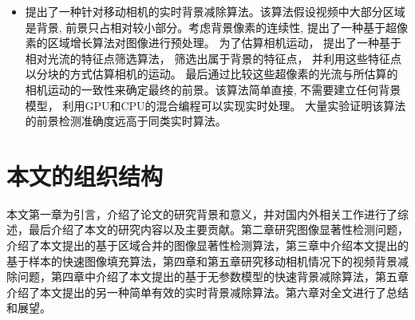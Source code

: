 \begin{itemize}
    \item 提出了一种针对移动相机的实时背景减除算法。该算法假设视频中大部分区域是背景, 前景只占相对较小部分。考虑背景像素的连续性, 提出了一种基于超像素的区域增长算法对图像进行预处理。 为了估算相机运动， 提出了一种基于相对光流的特征点筛选算法， 筛选出属于背景的特征点， 并利用这些特征点以分块的方式估算相机的运动。 最后通过比较这些超像素的光流与所估算的相机运动的一致性来确定最终的前景。该算法简单直接, 不需要建立任何背景模型， 利用GPU和CPU的混合编程可以实现实时处理。 大量实验证明该算法的前景检测准确度远高于同类实时算法。
  \end{itemize}
\section{本文的组织结构}
\label{sec:hierarchy} 
本文第一章为引言，介绍了论文的研究背景和意义，并对国内外相关工作进行了综述，最后介绍了本文的研究内容以及主要贡献。第二章研究图像显著性检测问题，介绍了本文提出的基于区域合并的图像显著性检测算法，第三章中介绍本文提出的基于样本的快速图像填充算法，第四章和第五章研究移动相机情况下的视频背景减除问题，第四章中介绍了本文提出的基于无参数模型的快速背景减除算法，第五章介绍了本文提出的另一种简单有效的实时背景减除算法。第六章对全文进行了总结和展望。
